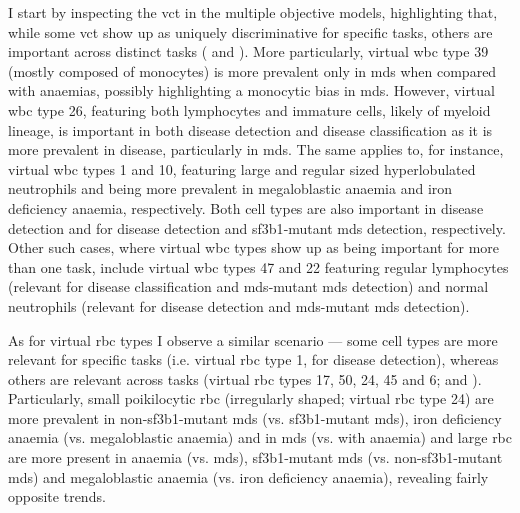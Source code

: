 I start by inspecting the \ac{vct} in the multiple objective models, highlighting that, while some \ac{vct} show up as uniquely discriminative for specific tasks, others are important across distinct tasks ( and ). More particularly, virtual \ac{wbc} type 39 (mostly composed of monocytes) is more prevalent only in \ac{mds} when compared with anaemias, possibly highlighting a monocytic bias in \ac{mds}. However, virtual \ac{wbc} type 26, featuring both lymphocytes and immature cells, likely of myeloid lineage, is important in both disease detection and disease classification as it is more prevalent in disease, particularly in \ac{mds}. The same applies to, for instance, virtual \ac{wbc} types 1 and 10, featuring large and regular sized hyperlobulated neutrophils and being more prevalent in megaloblastic anaemia and iron deficiency anaemia, respectively. Both cell types are also important in disease detection and for disease detection and \ac{sf3b1}-mutant \ac{mds} detection, respectively. Other such cases, where virtual \ac{wbc} types show up as being important for more than one task, include virtual \ac{wbc} types 47 and 22 featuring regular lymphocytes (relevant for disease classification and \ac{mds}-mutant \ac{mds} detection) and normal neutrophils (relevant for disease detection and \ac{mds}-mutant \ac{mds} detection). 

\begin{figure}[!ht]
    \label{fig:mile-vice-multi-objective-effects}
\end{figure}

\begin{figure}[!ht]
    \label{fig:wbc-mo-examples}
\end{figure}

As for virtual \ac{rbc} types I observe a similar scenario --- some cell types are more relevant for specific tasks (i.e. virtual \ac{rbc} type 1, for disease detection), whereas others are relevant across tasks (virtual \ac{rbc} types 17, 50, 24, 45 and 6;  and ). Particularly, small poikilocytic \ac{rbc} (irregularly shaped; virtual \ac{rbc} type 24) are more prevalent in non-\ac{sf3b1}-mutant \ac{mds} (vs. \ac{sf3b1}-mutant \ac{mds}), iron deficiency anaemia (vs. megaloblastic anaemia) and in \ac{mds} (vs. with anaemia) and large \ac{rbc} are more present in anaemia (vs. \ac{mds}), \ac{sf3b1}-mutant \ac{mds} (vs. non-\ac{sf3b1}-mutant \ac{mds}) and megaloblastic anaemia (vs. iron deficiency anaemia), revealing fairly opposite trends. 


